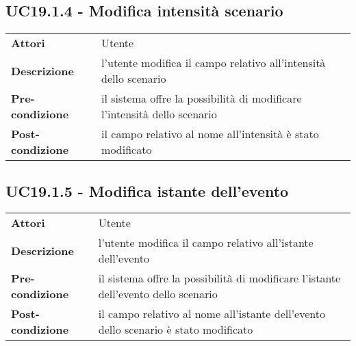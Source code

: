 \subsection{UC19.1.4 - Modifica intensità scenario}
\label{sssec:UC19.1.4}
\def\arraystretch{1.5}
\begin{tabularx}{\textwidth}{l|p{}}
\rowcolor{I} \multicolumn{2}{c}{\color{white}\textbf{UC19.1.4 - Modifica intensità scenario}} \\
\toprule
\endhead
\textbf{Attori} & Utente\\
\textbf{Descrizione} & l'utente modifica il campo relativo all'intensità dello scenario\\
\textbf{Pre-condizione} & il sistema offre la possibilità di modificare l'intensità dello scenario\\
\textbf{Post-condizione} & il campo relativo al nome all'intensità è stato modificato\\
\bottomrule
\end{tabularx}
\subsection{UC19.1.5 - Modifica istante dell'evento}
\label{sssec:UC19.1.5}
\def\arraystretch{1.5}
\begin{tabularx}{\textwidth}{l|p{}}
\rowcolor{I} \multicolumn{2}{c}{\color{white}\textbf{UC19.1.5 - Modifica istante dell'evento}} \\
\toprule
\endhead
\textbf{Attori} & Utente\\
\textbf{Descrizione} & l'utente modifica il campo relativo all'istante dell'evento\\
\textbf{Pre-condizione} & il sistema offre la possibilità di modificare l'istante dell'evento dello scenario\\
\textbf{Post-condizione} & il campo relativo al nome all'istante dell'evento dello scenario è stato modificato\\
\bottomrule
\end{tabularx}
